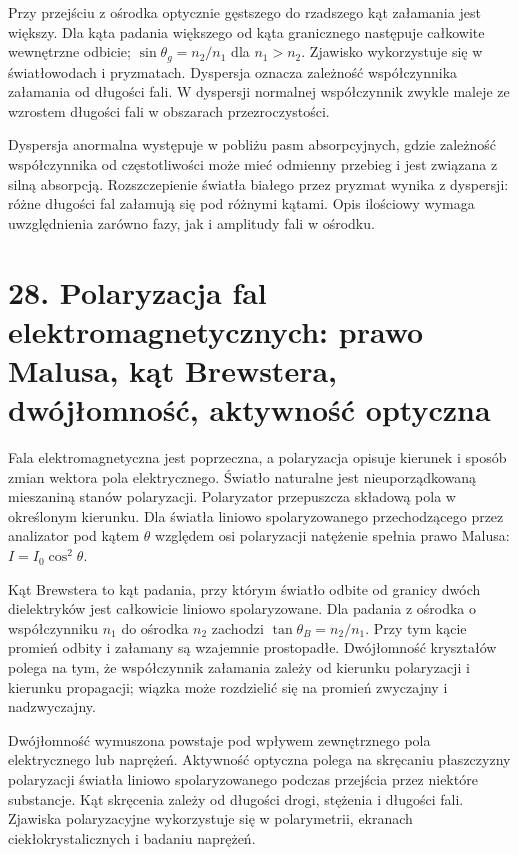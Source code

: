 \documentclass[11pt,a4paper,oneside]{report}
\begin{document}
Przy przejściu z ośrodka optycznie gęstszego do rzadszego kąt załamania jest większy. Dla kąta padania większego od kąta granicznego następuje całkowite wewnętrzne odbicie; \(\sin\theta_g=n_2/n_1\) dla \(n_1>n_2\). Zjawisko wykorzystuje się w światłowodach i pryzmatach. Dyspersja oznacza zależność współczynnika załamania od długości fali. W dyspersji normalnej współczynnik zwykle maleje ze wzrostem długości fali w obszarach przezroczystości.

Dyspersja anormalna występuje w pobliżu pasm absorpcyjnych, gdzie zależność współczynnika od częstotliwości może mieć odmienny przebieg i jest związana z silną absorpcją. Rozszczepienie światła białego przez pryzmat wynika z dyspersji: różne długości fal załamują się pod różnymi kątami. Opis ilościowy wymaga uwzględnienia zarówno fazy, jak i amplitudy fali w ośrodku.

\section{28. Polaryzacja fal elektromagnetycznych: prawo Malusa, kąt Brewstera, dwójłomność, aktywność optyczna}
Fala elektromagnetyczna jest poprzeczna, a polaryzacja opisuje kierunek i sposób zmian wektora pola elektrycznego. Światło naturalne jest nieuporządkowaną mieszaniną stanów polaryzacji. Polaryzator przepuszcza składową pola w określonym kierunku. Dla światła liniowo spolaryzowanego przechodzącego przez analizator pod kątem \(\theta\) względem osi polaryzacji natężenie spełnia prawo Malusa: \(I=I_0\cos^2\theta\).

Kąt Brewstera to kąt padania, przy którym światło odbite od granicy dwóch dielektryków jest całkowicie liniowo spolaryzowane. Dla padania z ośrodka o współczynniku \(n_1\) do ośrodka \(n_2\) zachodzi \(\tan\theta_B=n_2/n_1\). Przy tym kącie promień odbity i załamany są wzajemnie prostopadłe. Dwójłomność kryształów polega na tym, że współczynnik załamania zależy od kierunku polaryzacji i kierunku propagacji; wiązka może rozdzielić się na promień zwyczajny i nadzwyczajny.

Dwójłomność wymuszona powstaje pod wpływem zewnętrznego pola elektrycznego lub naprężeń. Aktywność optyczna polega na skręcaniu płaszczyzny polaryzacji światła liniowo spolaryzowanego podczas przejścia przez niektóre substancje. Kąt skręcenia zależy od długości drogi, stężenia i długości fali. Zjawiska polaryzacyjne wykorzystuje się w polarymetrii, ekranach ciekłokrystalicznych i badaniu naprężeń.
\end{document}
